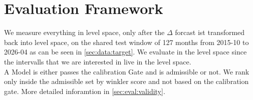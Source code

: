 %
%
\section{Evaluation Framework}
\label{sec:evaluation}

%
%
We measure everything in level space, only after the $\Delta$ forcast ist transformed back into level space, on the shared test window of 127 months from 2015-10 to 2026-04 as can be seen in \cref{sec:data:target}. We evaluate in the level space since the intervalls that we are interested in live in the level space. \\
A Model is either passes the calibration Gate and is admissible or not. We rank only inside the admissible set by winkler score and not based on the calibration gate. More detailed inforamtion in \cref{sec:eval:validity}. 

